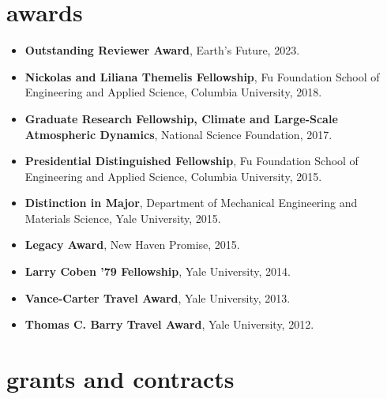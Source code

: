 \documentclass[10pt,oneside]{article}
\begin{document}

\section{awards}

\mbox{}\vspace{-\dimexpr\baselineskip\relax}

\begin{itemize}[label={}]
  
  \item \textbf{Outstanding Reviewer Award}, Earth's Future, 2023.
        
  \item \textbf{Nickolas and Liliana Themelis Fellowship}, Fu Foundation School of Engineering and Applied Science, Columbia University, 2018.
        
  \item \textbf{Graduate Research Fellowship, Climate and Large-Scale Atmospheric Dynamics}, National Science Foundation, 2017.
        
  \item \textbf{Presidential Distinguished Fellowship}, Fu Foundation School of Engineering and Applied Science, Columbia University, 2015.
        
  \item \textbf{Distinction in Major}, Department of Mechanical Engineering and Materials Science, Yale University, 2015.
        
  \item \textbf{Legacy Award}, New Haven Promise, 2015.
        
  \item \textbf{Larry Coben '79 Fellowship}, Yale University, 2014.
        
  \item \textbf{Vance-Carter Travel Award}, Yale University, 2013.
        
  \item \textbf{Thomas C. Barry Travel Award}, Yale University, 2012.
        
\end{itemize}



\section{grants and contracts}

\mbox{}\vspace{-\dimexpr\baselineskip\relax}
\end{document}
